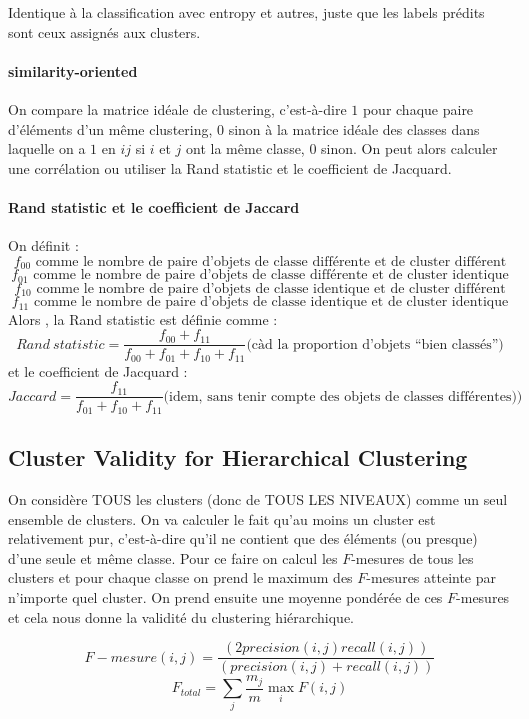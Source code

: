 \documentclass{article}
\begin{document}
\begin{sffamily}
Identique à la classification avec entropy et autres, juste que les labels prédits sont ceux assignés aux clusters.

\paragraph{similarity-oriented}

On compare la matrice idéale de clustering, c'est-à-dire $1$ pour chaque paire d'éléments d'un même clustering, $0$ sinon à la matrice 
idéale des classes dans laquelle on a $1$ en $ij$ si $i$ et $j$ ont la même classe, $0$ sinon. On peut alors calculer une corrélation ou 
utiliser la Rand statistic et le coefficient de Jacquard.

\paragraph{Rand statistic et le coefficient de Jaccard} On définit :
$$f_{00} \text{ comme le nombre de paire d'objets de classe différente et de cluster différent}$$
$$f_{01} \text{ comme le nombre de paire d'objets de classe différente et de cluster identique}$$
$$f_{10} \text{ comme le nombre de paire d'objets de classe identique et de cluster différent}$$
$$f_{11} \text{ comme le nombre de paire d'objets de classe identique et de cluster identique}$$
Alors , la Rand statistic est définie comme : 
$$ Rand\ statistic = \frac{f_{00}+f_{11}}{f_{00}+f_{01}+f_{10}+f_{11}} \text{(càd la proportion d'objets ``bien classés'')}$$
et le coefficient de Jacquard :
$$ Jaccard = \frac{f_{11}}{f_{01}+f_{10}+f_{11}} \text{(idem, sans tenir compte des objets de classes différentes))}$$

\subsection{Cluster Validity for Hierarchical Clustering}

On considère TOUS les clusters (donc de TOUS LES NIVEAUX) comme un seul ensemble de clusters. On va calculer le fait qu'au moins un cluster 
est relativement pur, c'est-à-dire qu'il ne contient que des éléments (ou presque) d'une seule et même classe. Pour ce faire on calcul les 
$F$-mesures de tous les clusters et pour chaque classe on prend le maximum des $F$-mesures atteinte par n'importe quel cluster. On prend 
ensuite une moyenne pondérée de ces $F$-mesures et cela nous donne la validité du clustering hiérarchique.

$$F-mesure(i,j) = \frac{(2precision(i,j)recall(i,j))}{(precision(i, j)+recall(i, j))}$$
$$F_{total} = \sum_j \frac{m_j}{m}\max_i{F(i,j)} $$


\end{sffamily}
\end{document}

